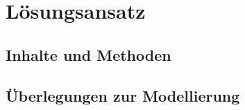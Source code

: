 \chapter{Lösungsansatz}\label{ch:approach}

\section{Inhalte und Methoden}

\section{Überlegungen zur Modellierung}